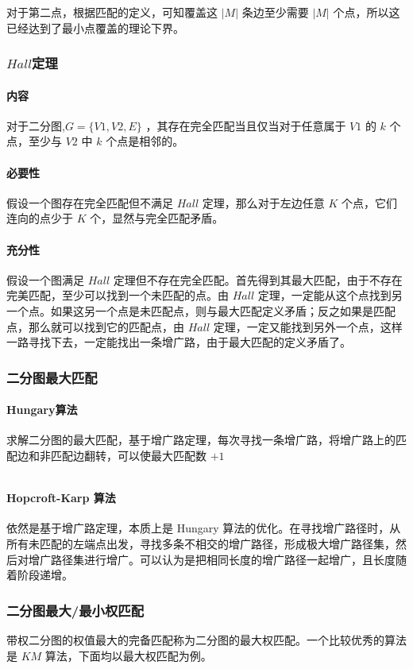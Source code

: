 \documentclass[UTF-8]{ctexart}
\newcommand{\cpp}[1]{\inputminted[bgcolor=bg,breaklines,breakanywhere=true]{c++}{#1}}
\begin{document}
			对于第二点，根据匹配的定义，可知覆盖这 $|M|$ 条边至少需要 $|M|$ 个点，所以这已经达到了最小点覆盖的理论下界。
			
			\subsubsection{$Hall$定理}
			\paragraph{内容} 对于二分图,$G=\{V1,V2,E\}$ ，其存在完全匹配当且仅当对于任意属于 $V1$ 的 $k$ 个点，至少与 $V2$ 中 $k$ 个点是相邻的。
			
			\paragraph{必要性} 假设一个图存在完全匹配但不满足 $Hall$ 定理，那么对于左边任意 $K$ 个点，它们连向的点少于 $K$ 个，显然与完全匹配矛盾。
			
			\paragraph{充分性} 假设一个图满足 $Hall$ 定理但不存在完全匹配。首先得到其最大匹配，由于不存在完美匹配，至少可以找到一个未匹配的点。由 $Hall$ 定理，一定能从这个点找到另一个点。如果这另一个点是未匹配点，则与最大匹配定义矛盾；反之如果是匹配点，那么就可以找到它的匹配点，由 $Hall$ 定理，一定又能找到另外一个点，这样一路寻找下去，一定能找出一条增广路，由于最大匹配的定义矛盾了。
				
			\subsubsection{二分图最大匹配}
			\paragraph{Hungary算法} 求解二分图的最大匹配，基于增广路定理，每次寻找一条增广路，将增广路上的匹配边和非匹配边翻转，可以使最大匹配数 $+1$
			\cpp{code//Graph//hungary.cpp}
			\paragraph{Hopcroft-Karp 算法} 依然是基于增广路定理，本质上是 Hungary 算法的优化。在寻找增广路径时，从所有未匹配的左端点出发，寻找多条不相交的增广路径，形成极大增广路径集，然后对增广路径集进行增广。可以认为是把相同长度的增广路径一起增广，且长度随着阶段递增。
			\subsubsection{二分图最大/最小权匹配}
			带权二分图的权值最大的完备匹配称为二分图的最大权匹配。一个比较优秀的算法是 $KM$ 算法，下面均以最大权匹配为例。
			
\end{document}
